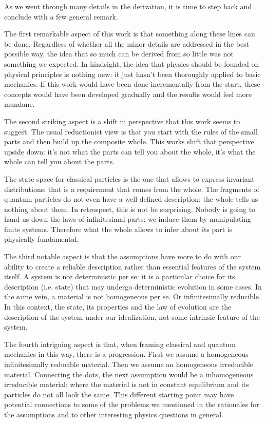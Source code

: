 \documentclass[aps,pra,10pt,twocolumn,floatfix,nofootinbib]{revtex4-1}
\numberwithin{equation}{section}
\theoremstyle{definition}
\begin{document}
As we went through many details in the derivation, it is time to step back and conclude with a few general remark.

The first remarkable aspect of this work is that something along these lines can be done. Regardless of whether all the minor details are addressed in the best possible way, the idea that so much can be derived from so little was not something we expected. In hindsight, the idea that physics should be founded on physical principles is nothing new: it just hasn't been thoroughly applied to basic mechanics. If this work would have been done incrementally from the start, these concepts would have been developed gradually and the results would feel more mundane.

The second striking aspect is a shift in perspective that this work seems to suggest. The usual reductionist view is that you start with the rules of the small parts and then build up the composite whole. This works shift that perspective upside down: it's not what the parts can tell you about the whole, it's what the whole can tell you about the parts.

The state space for classical particles is the one that allows to express invariant distributions: that is a requirement that comes from the whole. The fragments of quantum particles do not even have a well defined description: the whole tells us nothing about them. In retrospect, this is not be surprising. Nobody is going to hand us down the laws of infinitesimal parts: we induce them by manipulating finite systems. Therefore what the whole allows to infer about its part is physically fundamental.

The third notable aspect is that the assumptions have more to do with our ability to create a reliable description rather than essential features of the system itself. A system is not deterministic per se: it is a particular choice for its description (i.e. state) that may undergo deterministic evolution in some cases. In the same vein, a material is not homogeneous per se. Or infinitesimally reducible. In this context, the state, its properties and the law of evolution are the description of the system under our idealization, not some intrinsic feature of the system.

The fourth intriguing aspect is that, when framing classical and quantum mechanics in this way, there is a progression. First we assume a homogeneous infinitesimally reducible material. Then we assume an homogeneous irreducible material. Connecting the dots, the next assumption would be a inhomogeneous irreducible material: where the material is not in constant equilibrium and its particles do not all look the same. This different starting point may have potential connections to some of the problems we mentioned in the rationales for the assumptions and to other interesting physics questions in general.
\end{document}
